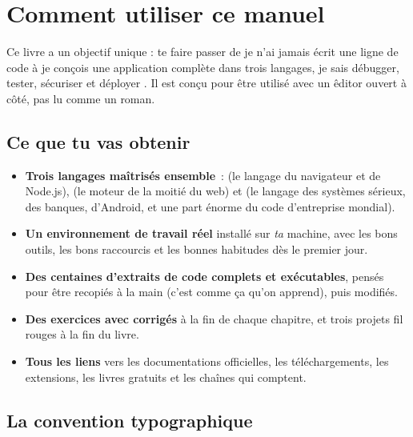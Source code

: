 \chapter{Comment utiliser ce manuel}
\label{ch-comment}

Ce livre a un objectif unique : te faire passer de \og je n'ai jamais \'ecrit une ligne de
code \fg{} \`a \og je con\c{c}ois une application compl\`ete dans trois langages, je sais d\'ebugger,
tester, s\'ecuriser et d\'eployer \fg{}. Il est con\c{c}u pour \^etre utilis\'e avec un \^editor ouvert
\`a c\^ot\'e, pas lu comme un roman.

\section{Ce que tu vas obtenir}

\begin{objectif}
\begin{itemize}
  \item \textbf{Trois langages ma\^itris\'es ensemble}~: \langjs{} (le langage du navigateur et de
        Node.js), \langphp{} (le moteur de la moiti\'e du web) et \langjava{} (le langage des
        syst\`emes s\'erieux, des banques, d'Android, et une part \'enorme du code d'entreprise mondial).
  \item \textbf{Un environnement de travail r\'eel} install\'e sur \emph{ta} machine, avec les bons
        outils, les bons raccourcis et les bonnes habitudes d\`es le premier jour.
  \item \textbf{Des centaines d'extraits de code complets et ex\'ecutables}, pens\'es pour \^etre
        recopi\'es \`a la main (c'est comme \c{c}a qu'on apprend), puis modifi\'es.
  \item \textbf{Des exercices avec corrig\'es} \`a la fin de chaque chapitre, et trois projets
        fil rouges \`a la fin du livre.
  \item \textbf{Tous les liens} vers les documentations officielles, les t\'el\'echargements, les
        extensions, les livres gratuits et les cha\^ines qui comptent.
\end{itemize}
\end{objectif}

\section{La convention typographique}

